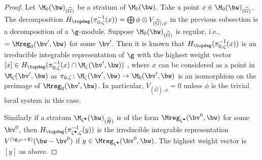 \begin{proof}
Let $\M_0(\bw)_{(\widehat G)}$ be a stratum of $\M_0(\bw)$. Take a point
$x\in \M_0(\bw)_{(\widehat G)}$. The decomposition
$H_{\topdeg}(\pi_{0,\zeta}^{-1}(x)) = \bigoplus
\phi\otimes V_{(\widehat G),\phi}$ in the previous subsection is a
decomposition of a $\g$-module.
%
Suppose $\M_0(\bw)_{(\widehat G)}$ is regular, i.e., $=
\Mreg_0(\bv',\bw)$ for some $\bv'$.
%
Then it is known that $H_{\topdeg}(\pi_{0,\zeta}^{-1}(x))$ is an
irreducible integrable representation of $\g$ with the highest weight
vector $[x] \in H_{\topdeg}(\pi_{0,\zeta}^{-1}(x)\cap
\M_\zeta(\bv',\bw))$ \cite[10.2]{Na-alg}, where
$x$ can be considered as a point in $\M_\zeta(\bv',\bw)$ as
$\pi_{0,\zeta}\colon \M_\zeta(\bv',\bw)\to \M_0(\bv',\bw)$ is an
isomorphism on the preimage of $\Mreg_0(\bv',\bw)$.
%
In particular, $V_{(\widehat G),\phi} = 0$ unless $\phi$ is the
trivial local system in this case.

Similarly if a stratum $\M_{\zeta^\bullet}(\bw)_{(\widehat H)}$ is of
the form $\Mreg_{\zeta^\bullet}(\bv^0,\bw)$ for some $\bv^0$, then
$H_{\topdeg}(\pi_{\zeta^\bullet,\zeta}^{-1}(y))$ is the irreducible
integrable representation $V^{(\g_{I^0}+\mathfrak h)}(\bw-\bv^0)$ if
$y\in \Mreg_{\zeta^\bullet}(\bv^0,\bw)$.
The highest weight vector is $[y]$ as above.


\end{proof}
